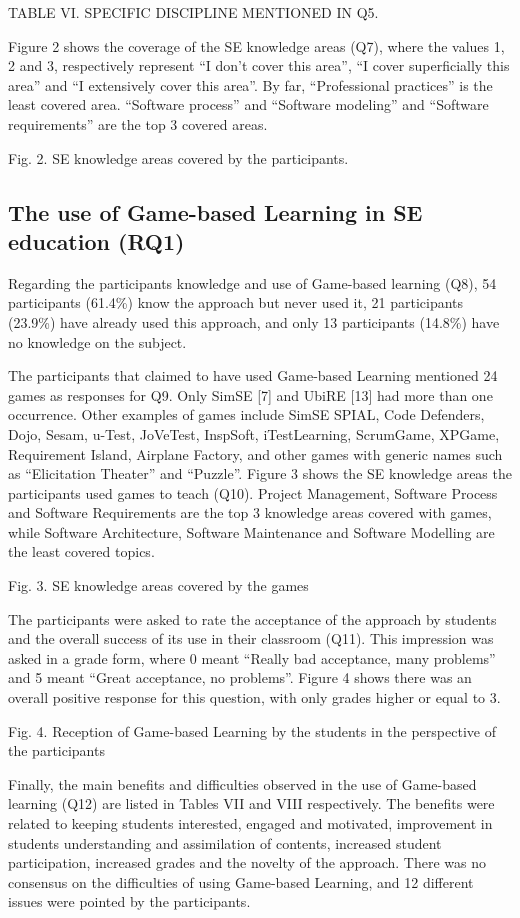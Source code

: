 TABLE VI. SPECIFIC DISCIPLINE MENTIONED IN Q5.

Figure 2 shows the coverage of the SE knowledge areas (Q7), where the values 1, 2 and 3, respectively represent “I don't cover this area”, “I cover superficially this area” and “I extensively cover this area”.  By far, “Professional practices” is the least covered area. “Software process” and “Software modeling” and “Software requirements” are the top 3 covered areas.
 
Fig. 2. SE knowledge areas covered by the participants.

\subsection{The use of Game-based Learning in SE education (RQ1)}
	
Regarding the participants knowledge and use of Game-based learning (Q8), 54 participants (61.4\%) know the approach but never used it, 21 participants (23.9\%) have already used this approach, and only 13 participants (14.8\%) have no knowledge on the subject.

The participants that claimed to have used Game-based Learning mentioned 24 games as responses for Q9. Only SimSE [7] and UbiRE [13] had more than one occurrence. Other examples of games include SimSE SPIAL, Code Defenders, Dojo, Sesam, u-Test, JoVeTest, InspSoft, iTestLearning, ScrumGame, XPGame, Requirement Island, Airplane Factory, and other games with generic names such as “Elicitation Theater” and “Puzzle”. Figure 3 shows the SE knowledge areas the participants used games to teach (Q10). Project Management, Software Process and Software Requirements are the top 3 knowledge areas covered with games, while Software Architecture, Software Maintenance and Software Modelling are the least covered topics.
 
Fig. 3. SE knowledge areas covered by the games

The participants were asked to rate the acceptance of the approach by students and the overall success of its use in their classroom (Q11). This impression was asked in a grade form, where 0 meant “Really bad acceptance, many problems” and 5 meant “Great acceptance, no problems”. Figure 4 shows there was an overall positive response for this question, with only grades higher or equal to 3.
 
Fig. 4. Reception of Game-based Learning by the students in the perspective of the participants

Finally, the main benefits and difficulties observed in the use of Game-based learning (Q12) are listed in Tables VII and VIII respectively. The benefits were related to keeping students interested, engaged and motivated, improvement in students understanding and assimilation of contents, increased student participation, increased grades and the novelty of the approach. There was no consensus on the difficulties of using Game-based Learning, and 12 different issues were pointed by the participants.

